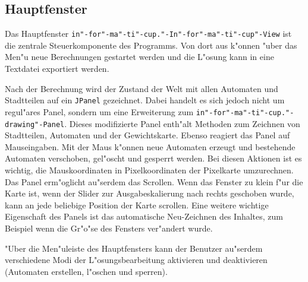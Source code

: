 \subsection{Hauptfenster}
Das Hauptfenster \texttt{in"-for"-ma"-ti"-cup."-In"-for"-ma"-ti"-cup"-View} ist die zentrale Steuerkomponente des Programms. Von dort aus k"onnen "uber das Men"u neue Berechnungen gestartet werden und die L"osung kann in eine Textdatei exportiert werden. 

Nach der Berechnung wird der Zustand der Welt mit allen Automaten und Stadtteilen auf ein \texttt{JPanel} gezeichnet. Dabei handelt es sich jedoch nicht um regul"ares Panel, sondern um eine Erweiterung zum \texttt{in"-for"-ma"-ti"-cup."-drawing"-Panel}. Dieses modifizierte Panel enth"alt Methoden zum Zeichnen von Stadtteilen, Automaten und der Gewichtskarte. Ebenso reagiert das Panel auf Mauseingaben. Mit der Maus k"onnen neue Automaten erzeugt und bestehende Automaten verschoben, gel"oscht und gesperrt werden. Bei diesen Aktionen ist es wichtig, die Mauskoordinaten in Pixelkoordinaten der Pixelkarte umzurechnen. Das Panel erm"oglicht au"serdem das Scrollen. Wenn das Fenster zu klein f"ur die Karte ist, wenn der Slider zur Ausgabeskalierung nach rechts geschoben wurde, kann an jede beliebige Position der Karte scrollen. Eine weitere wichtige Eigenschaft des Panels ist das automatische Neu-Zeichnen des Inhaltes, zum Beispiel wenn die Gr"o"se des Fensters ver"andert wurde.

"Uber die Men"uleiste des Hauptfensters kann der Benutzer au"serdem verschiedene Modi der L"osungsbearbeitung aktivieren und deaktivieren (Automaten erstellen, l"oschen und sperren). 
